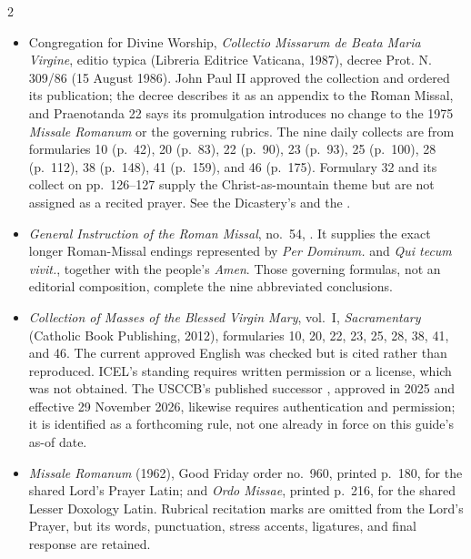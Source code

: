 \begin{multicols}{2}
\begin{itemize}
\item Congregation for Divine Worship, \textit{Collectio Missarum de Beata Maria Virgine}, editio typica (Libreria Editrice Vaticana, 1987), decree Prot. N. 309/86 (15 August 1986). John Paul II approved the collection and ordered its publication; the decree describes it as an appendix to the Roman Missal, and Praenotanda 22 says its promulgation introduces no change to the 1975 \textit{Missale Romanum} or the governing rubrics. The nine daily collects are from formularies 10 (p.~42), 20 (p.~83), 22 (p.~90), 23 (p.~93), 25 (p.~100), 28 (p.~112), 38 (p.~148), 41 (p.~159), and 46 (p.~175). Formulary 32 and its collect on pp.~126--127 supply the Christ-as-mountain theme but are not assigned as a recited prayer. See the Dicastery's  and the .
\item \textit{General Instruction of the Roman Missal}, no.~54, . It supplies the exact longer Roman-Missal endings represented by \textit{Per Dominum.} and \textit{Qui tecum vivit.}, together with the people's \textit{Amen}. Those governing formulas, not an editorial composition, complete the nine abbreviated conclusions.
\item \textit{Collection of Masses of the Blessed Virgin Mary}, vol.~I, \textit{Sacramentary} (Catholic Book Publishing, 2012), formularies 10, 20, 22, 23, 25, 28, 38, 41, and 46. The current approved English was checked but is cited rather than reproduced. ICEL's standing  requires written permission or a license, which was not obtained. The USCCB's published successor , approved in 2025 and effective 29 November 2026, likewise requires authentication and permission; it is identified as a forthcoming rule, not one already in force on this guide's as-of date.
\item \textit{Missale Romanum} (1962), Good Friday order no.~960, printed p.~180, for the shared Lord's Prayer Latin; and \textit{Ordo Missae}, printed p.~216, for the shared Lesser Doxology Latin. Rubrical recitation marks are omitted from the Lord's Prayer, but its words, punctuation, stress accents, ligatures, and final response are retained.

\end{itemize}
\end{multicols}
